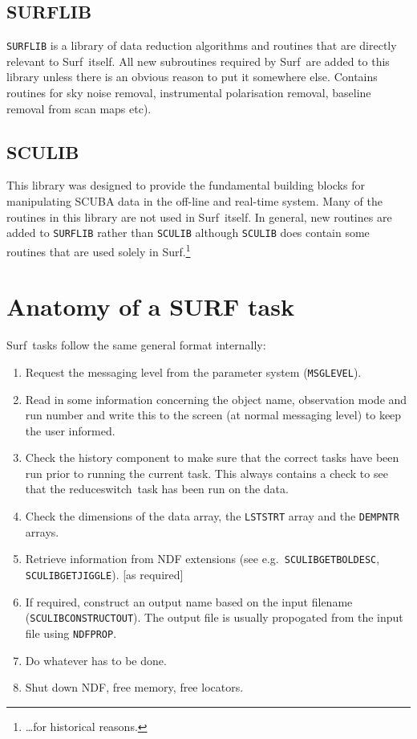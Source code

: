 \documentclass[twoside,11pt]{article}
\newcommand{\task}[1]{{\sf #1}}
\newcommand{\param}[1]{{\tt #1}}
\newcommand{\resw}{\xref{\task{reduce\_switch}}{sun216}{REDUCE_SWITCH}}
\newcommand{\scusoft}          {{\sc Surf}}
\newcommand{\xref}[3]{#1}
\renewcommand{\_}{\texttt{\symbol{95}}}
\begin{document}
\subsection{SURFLIB}

\texttt{SURFLIB} is a library of data reduction algorithms and routines that
are directly relevant to \scusoft\ itself. All new subroutines required by
\scusoft\ are added to this library unless there is an obvious reason to put
it somewhere else. Contains routines for sky noise removal, instrumental
polarisation removal, baseline removal from scan maps etc).


\subsection{SCULIB}

This library was designed to provide the fundamental building blocks for
manipulating SCUBA data in the off-line and real-time system. Many of the
routines in this library are not used in \scusoft\ itself. In general,
new routines are added to \texttt{SURFLIB} rather than \texttt{SCULIB}
although \texttt{SCULIB} does contain some routines that are used solely in
\scusoft.\footnote{\ldots for historical reasons.}


\section{Anatomy of a SURF task}

\scusoft\ tasks follow the same general format internally:

\begin{enumerate}
\item Request the messaging level from the parameter system
(\param{MSG\_LEVEL}).
\item Read in some information concerning the object name, observation mode
and run number and write this to the screen (at normal messaging level) to
keep the user informed.
\item Check the history component to make sure that the correct tasks have
been run prior to running the current task. This always contains a check to
see that the \resw\ task has been run on the data.
\item Check the dimensions of the data array, the \texttt{LST\_STRT} array and
the \texttt{DEM\_PNTR} arrays.
\item Retrieve information from NDF extensions (see e.g.\
\texttt{SCULIB\_GET\_BOL\_DESC}, \texttt{SCULIB\_GET\_JIGGLE}). [as required]
\item If required, construct an output name based on the input filename
(\texttt{SCULIB\_CONSTRUCT\_OUT}). The output file is usually propogated from
the input file using \texttt{NDF\_PROP}.
\item Do whatever has to be done.
\item Shut down NDF, free memory, free locators.

\end{enumerate}
\end{document}
